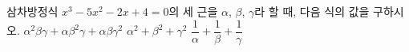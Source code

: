 삼차방정식 $x^3-5x^2-2x+4=0$의 세 근을 $\alpha$, $\beta$, $\gamma$라 할 때, 다음 식의 값을 구하시오.
 $\alpha^2\beta\gamma+\alpha\beta^2\gamma+\alpha\beta\gamma^2$
 $\alpha^2+\beta^2+\gamma^2$
 $\dfrac{1}{\alpha}+\dfrac{1}{\beta}+\dfrac{1}{\gamma}$
